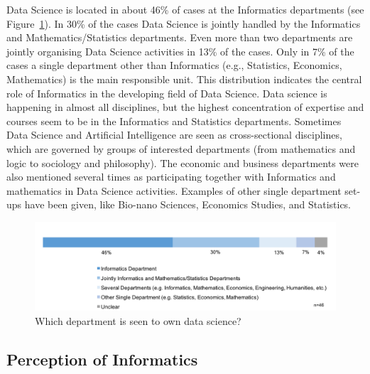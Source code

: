 Data Science is located in about 46\% of cases at the Informatics departments (see Figure~\ref{sect4:discipline}). In 30\% of the cases Data Science is jointly handled by the Informatics and Mathematics/Statistics departments. Even more than two departments are jointly organising Data Science activities in 13\% of the cases. Only in 7\% of the cases a single department other than Informatics (e.g., Statistics, Economics, Mathematics) is the main responsible unit. This distribution indicates the central role of Informatics in the developing field of Data Science. Data science is happening in almost all disciplines, but the highest concentration of expertise and courses seem to be in the Informatics and Statistics departments. Sometimes Data Science and Artificial Intelligence are seen as cross-sectional disciplines, which are governed by groups of interested departments (from mathematics and logic to sociology and philosophy). The economic and business departments were also mentioned several times as participating together with Informatics and mathematics in Data Science activities. Examples of other single department set-ups have been given, like Bio-nano Sciences, Economics Studies, and Statistics.

\begin{figure}[h]
\centering
\includegraphics[width = \linewidth]{charts/4a.png}
\caption{Which department is seen to own data science?}
\label{sect4:discipline}
\end{figure}

\subsection{Perception of Informatics}

